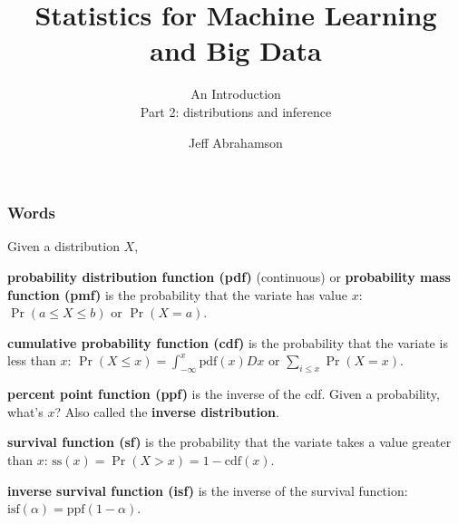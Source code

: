

\title
{Statistics for Machine Learning and Big Data}
\subtitle{An Introduction\\[6mm] Part 2: distributions and inference}

\author[Abrahamson] {Jeff Abrahamson}




\begin{frame}
  \titlepage
\end{frame}


\begin{frame}
  \frametitle{Words}

  Given a distribution $X$,

   {
    \textbf{probability distribution function (pdf)} (continuous) or
    \textbf{probability mass function (pmf)} is the probability that
    the variate has value $x$:  $\Pr(a\le X \le b)$ or $\Pr(X=a)$.
  }
  
   {
    \textbf{cumulative probability function (cdf)} is the probability
    that the variate is less than $x$:  $\Pr(X\le x) =
    \int_{-\infty}^x \text{pdf}(x) D{x}$ or $\sum_{i\le x} \Pr(X = x)$.
  }
  
   {
    \textbf{percent point function (ppf)} is the inverse of the cdf.
    Given a probability, what's $x$?
    Also called the \textbf{inverse distribution}.
  }
  
   {
    \textbf{survival function (sf)} is the probability that the
    variate takes a value greater than $x$: $\text{ss}(x) = \Pr(X > x)
    = 1-\text{cdf}(x)$.
  }
  
   {
    \textbf{inverse survival function (isf)} is the inverse of the
    survival function: 
    $\text{isf}(\alpha) = \text{ppf}(1-\alpha)$.
    
  }

\end{frame}

